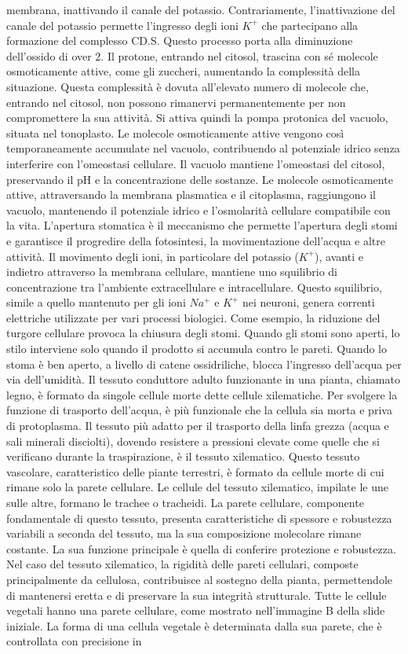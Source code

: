 \documentclass[11pt, a4paper]{article}
\begin{document}
\begin{spacing}{1.15}
membrana, inattivando il canale del potassio. Contrariamente, l'inattivazione del canale del potassio permette l'ingresso degli ioni $K^+$ che partecipano alla formazione del complesso CD.S. Questo processo porta alla diminuzione dell'ossido di over 2. Il protone, entrando nel citosol, trascina con sé molecole osmoticamente attive, come gli zuccheri, aumentando la complessità della situazione. Questa complessità è dovuta all'elevato numero di molecole che, entrando nel citosol, non possono rimanervi permanentemente per non compromettere la sua attività. Si attiva quindi la pompa protonica del vacuolo, situata nel tonoplasto. Le molecole osmoticamente attive vengono così temporaneamente accumulate nel vacuolo, contribuendo al potenziale idrico senza interferire con l'omeostasi cellulare.  Il vacuolo mantiene l'omeostasi del citosol, preservando il pH e la concentrazione delle sostanze. Le molecole osmoticamente attive, attraversando la membrana plasmatica e il citoplasma, raggiungono il vacuolo, mantenendo il potenziale idrico e l'osmolarità cellulare compatibile con la vita. L'apertura stomatica è il meccanismo che permette l'apertura degli stomi e garantisce il progredire della fotosintesi, la movimentazione dell'acqua e altre attività. Il movimento degli ioni, in particolare del potassio ($K^+$), avanti e indietro attraverso la membrana cellulare, mantiene uno squilibrio di concentrazione tra l'ambiente extracellulare e intracellulare. Questo squilibrio, simile a quello mantenuto per gli ioni $Na^+$ e $K^+$ nei neuroni, genera correnti elettriche utilizzate per vari processi biologici.  Come esempio, la riduzione del turgore cellulare provoca la chiusura degli stomi. Quando gli stomi sono aperti, lo stilo interviene solo quando il prodotto si accumula contro le pareti. Quando lo stoma è ben aperto, a livello di catene ossidriliche, blocca l'ingresso dell'acqua per via dell'umidità. Il tessuto conduttore adulto funzionante in una pianta, chiamato legno, è formato da singole cellule morte dette cellule xilematiche. Per svolgere la funzione di trasporto dell'acqua, è più funzionale che la cellula sia morta e priva di protoplasma. Il tessuto più adatto per il trasporto della linfa grezza (acqua e sali minerali disciolti), dovendo resistere a pressioni elevate come quelle che si verificano durante la traspirazione, è il tessuto xilematico. Questo tessuto vascolare, caratteristico delle piante terrestri, è formato da cellule morte di cui rimane solo la parete cellulare. Le cellule del tessuto xilematico, impilate le une sulle altre, formano le trachee o tracheidi. La parete cellulare, componente fondamentale di questo tessuto, presenta caratteristiche di spessore e robustezza variabili a seconda del tessuto, ma la sua composizione molecolare rimane costante. La sua funzione principale è quella di conferire protezione e robustezza. Nel caso del tessuto xilematico, la rigidità delle pareti cellulari, composte principalmente da cellulosa, contribuisce al sostegno della pianta, permettendole di mantenersi eretta e di preservare la sua integrità strutturale. Tutte le cellule vegetali hanno una parete cellulare, come mostrato nell'immagine B della slide iniziale. La forma di una cellula vegetale è determinata dalla sua parete, che è controllata con precisione in 
\end{spacing}
\end{document}
